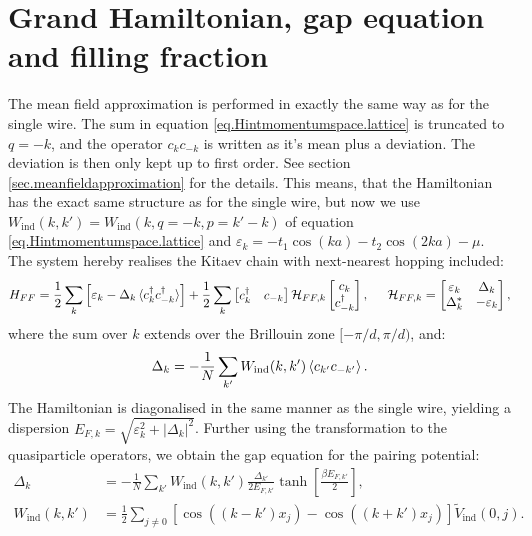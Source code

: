 \section{Grand Hamiltonian, gap equation and filling fraction} \label{sec.grandhamiltonian.lattice}
The mean field approximation is performed in exactly the same way as for the single wire. The sum in equation \eqref{eq.Hintmomentumspace.lattice} is truncated to $q = -k$, and the operator $c_kc_{-k}$ is written as it's mean plus a deviation. The deviation is then only kept up to first order. See section \ref{sec.meanfieldapproximation} for the details. This means, that the Hamiltonian has the exact same structure as for the single wire, but now we use $W_{\text{ind}}(k, k') = W_{\text{ind}}(k, q = -k, p = k' - k)$ of equation \eqref{eq.Hintmomentumspace.lattice} and $\varepsilon_k = - t_1\cos(ka) - t_2\cos(2ka) - \mu$. The system hereby realises the Kitaev chain with next-nearest hopping included: 
\begin{equation}
H_{FF} = \frac{1}{2}\sum_k \left[\varepsilon_k - \Delta_k \braket {c^\dagger_k c^\dagger_{-k}}\right] + \frac{1}{2}\sum_{k} \begin{bmatrix} c_k^\dagger & c_{-k} \end{bmatrix} \mathcal{H}_{FF,k} \begin{bmatrix} c_k \\ c^\dagger_{-k} \end{bmatrix}, \hspace{0.5cm} \mathcal{H}_{FF,k} = \begin{bmatrix} \varepsilon_k & \Delta_k \\ \Delta^*_k & -\varepsilon_k \end{bmatrix}, 
\label{eq.grandhamiltonian.lattice}
\end{equation}
where the sum over $k$ extends over the Brillouin zone $[-\pi/d, \pi/d )$, and: 
\begin{equation}
\Delta_k = - \frac{1}{N}\sum_{k'} W_{\text{ind}}(k,k')\braket{c_{k'}c_{-k'}}.
\label{eq.pairingpotential.lattice}
\end{equation}
The Hamiltonian is diagonalised in the same manner as the single wire, yielding a dispersion $E_{F,k} = \sqrt{\varepsilon^2_k + |\Delta_k|^2}$. Further using the transformation to the quasiparticle operators, we obtain the gap equation for the pairing potential: 
\begin{align}
\Delta_k &= - \frac{1}{N}\sum_{k'} W_{\text{ind}}(k,k')\frac{\Delta_{k'}}{2E_{F,k'}}\tanh\left[\frac{\beta E_{F,k'}}{2}\right], \nonumber \\
W_{\text{ind}}(k,k') &= \frac{1}{2}\sum_{j\neq 0} \left[\cos((k - k')x_j) - \cos((k + k')x_j) \right]\tilde{V}_{\text{ind}}(0, j).
\label{eq.gapequation.lattice}
\end{align}
